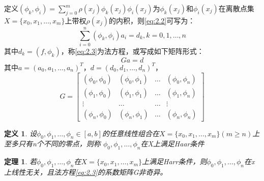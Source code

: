 \documentclass[a4paper]{article}
\newtheorem{definition}{定义}[section]
\newtheorem{theorem}{定理}[section]
\begin{document}
\noindent 定义$(\phi_k, \phi_i) = \sum^m_{j=0}\rho(x_j)\phi_k(x_j)\phi_i(x_j) $为$\phi_k(x_j)$和$\phi_i(x_j)$在离散点集$X = \{x_0, x_1, \dots, x_m\}$上带权$\rho(x_j)$的内积，则\ref{eq:2.2}可写为：
\begin{equation}
    \sum^n_{i=0}(\phi_k, \phi_i)a_i = d_k, k = 0,1,\dots, n
    \label{eq:2.3}
\end{equation}
其中$d_k=(f, \phi_k)$，称\ref{eq:2.3}为法方程，或写成如下矩阵形式：
$$Ga=d$$
其中$a=(a_0, a_1, \dots, a_n)^T$，$d=(d_0, d_1, \dots, d_n)^T$，
$$G = \left[
    \begin{matrix}
        (\phi_0, \phi_0) & (\phi_0, \phi_1) & \dots & (\phi_0, \phi_n) \\
        (\phi_1, \phi_0) & (\phi_1, \phi_1) & \dots & (\phi_1, \phi_n) \\
        \vdots & \dots & \dots & \vdots \\
        (\phi_n, \phi_0) & (\phi_n, \phi_1) & \dots & (\phi_n, \phi_n)
    \end{matrix}
    \right]$$

\begin{definition}
    设$\phi_0, \phi_1, \dots, \phi_n\in [a,b]$的任意线性组合在$X=\{x_0, x_1, \dots, x_m\}(m\ge n)$上至多只有n个不同的零点，则称
    $\phi_0, \phi_1, \dots, \phi_n$在X上满足Haar条件
\end{definition}

\begin{theorem}
    若$\phi_0, \phi_1, \dots, \phi_n$在$X=\{x_0, x_1, \dots, x_m\}$上满足Harr条件，则$\phi_0, \phi_1, \dots, \phi_n$在x上线性无关，且法方程\ref{eq:2.3}的系数矩阵G非奇异。
\end{theorem}
\end{document}

